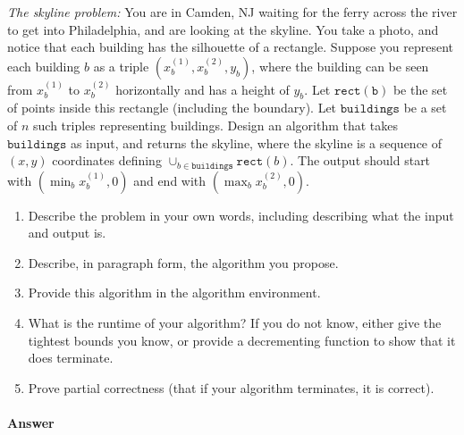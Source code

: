 \documentclass{article}
\begin{document}
\emph{The skyline problem:} You are in Camden, NJ waiting for the ferry across the river to
get into Philadelphia, and are looking at the skyline.  You take a photo, and notice that each building
has the silhouette of a rectangle.  Suppose you  represent each building $b$ as a
triple $(x_b^{(1)},x_b^{(2)},y_b)$, where the building can be seen from $x_b^{(1)}$ to $x_b^{(2)}$
horizontally and has a height of $y_b$.  Let $\mathtt{rect(b)}$ be the set of
points inside this rectangle (including the boundary).  Let $\mathtt{buildings}$
be a set of $n$ such triples representing buildings. Design an algorithm that takes $\mathtt{buildings}$ as input, and
returns the skyline, where the skyline is a sequence of~$(x,y)$ coordinates
defining $\cup_{b \in \mathtt{buildings}} \mathtt{rect}(b)$.  The output should
start with $(\min_b{x_b^{(1)}},0)$ and end with $(\max_b{x_b^{(2)}},0)$.

\begin{enumerate}
    \item Describe the problem in your own words, including describing what the input and output is.
    \item Describe, in paragraph form, the algorithm you propose.
    \item Provide this algorithm in the algorithm environment.
    \item What is the runtime of your algorithm? If you do not know, either give the tightest bounds you know, or provide a decrementing function to show that it does terminate.
    \item Prove partial correctness (that if your algorithm terminates, it is correct).
\end{enumerate}

\paragraph{Answer}

\end{document}
